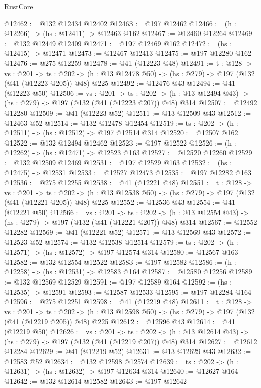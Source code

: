 \begin{lexlean}{RustCore}
\begin{coremodule}
@12462 := @132 @12434 @12402
@12463 := @197 @12462
@12466 := (h : @12266) -> (hs : @12411) -> @12463 @162
@12467 := @12460 @12264
@12469 := @132 @12449 @12409
@12471 := @197 @12469 @162
@12472 := (hs : @12415) -> @12471
@12473 := @12467 @12413
@12475 := @197 @12280 @162
@12476 := @275 @12259
@12478 := @41 (@12223 @48)
@12491 := {t : @128} ->
  {vs : @201} ->
  {ts : @202} -> (h : @13 @12478 @50) -> (hs : @279) -> @197 (@132 (@41 (@12223 @205)) @48) @225
@12492 := @12476 @43
@12494 := @41 (@12223 @50)
@12506 := {vs : @201} ->
  {ts : @202} -> (h : @13 @12494 @43) -> (hs : @279) -> @197 (@132 (@41 (@12223 @207)) @48) @314
@12507 := @12492 @12280
@12509 := @41 (@12223 @52)
@12511 := @13 @12509 @43
@12512 := @12463 @52
@12514 := @132 @12478 @12454
@12519 := {ts : @202} -> (h : @12511) -> (hs : @12512) -> @197 @12514 @314
@12520 := @12507 @162
@12522 := @132 @12494 @12462
@12523 := @197 @12522
@12526 := (h : @12262) -> (hs : @12471) -> @12523 @163
@12527 := @12520 @12260
@12529 := @132 @12509 @12469
@12531 := @197 @12529 @163
@12532 := (hs : @12475) -> @12531
@12533 := @12527 @12473
@12535 := @197 @12282 @163
@12536 := @275 @12255
@12538 := @41 (@12221 @48)
@12551 := {t : @128} ->
  {vs : @201} ->
  {ts : @202} -> (h : @13 @12538 @50) -> (hs : @279) -> @197 (@132 (@41 (@12221 @205)) @48) @225
@12552 := @12536 @43
@12554 := @41 (@12221 @50)
@12566 := {vs : @201} ->
  {ts : @202} -> (h : @13 @12554 @43) -> (hs : @279) -> @197 (@132 (@41 (@12221 @207)) @48) @314
@12567 := @12552 @12282
@12569 := @41 (@12221 @52)
@12571 := @13 @12569 @43
@12572 := @12523 @52
@12574 := @132 @12538 @12514
@12579 := {ts : @202} -> (h : @12571) -> (hs : @12572) -> @197 @12574 @314
@12580 := @12567 @163
@12582 := @132 @12554 @12522
@12583 := @197 @12582
@12586 := (h : @12258) -> (hs : @12531) -> @12583 @164
@12587 := @12580 @12256
@12589 := @132 @12569 @12529
@12591 := @197 @12589 @164
@12592 := (hs : @12535) -> @12591
@12593 := @12587 @12533
@12595 := @197 @12284 @164
@12596 := @275 @12251
@12598 := @41 (@12219 @48)
@12611 := {t : @128} ->
  {vs : @201} ->
  {ts : @202} -> (h : @13 @12598 @50) -> (hs : @279) -> @197 (@132 (@41 (@12219 @205)) @48) @225
@12612 := @12596 @43
@12614 := @41 (@12219 @50)
@12626 := {vs : @201} ->
  {ts : @202} -> (h : @13 @12614 @43) -> (hs : @279) -> @197 (@132 (@41 (@12219 @207)) @48) @314
@12627 := @12612 @12284
@12629 := @41 (@12219 @52)
@12631 := @13 @12629 @43
@12632 := @12583 @52
@12634 := @132 @12598 @12574
@12639 := {ts : @202} -> (h : @12631) -> (hs : @12632) -> @197 @12634 @314
@12640 := @12627 @164
@12642 := @132 @12614 @12582
@12643 := @197 @12642

\end{coremodule}
\end{lexlean}

